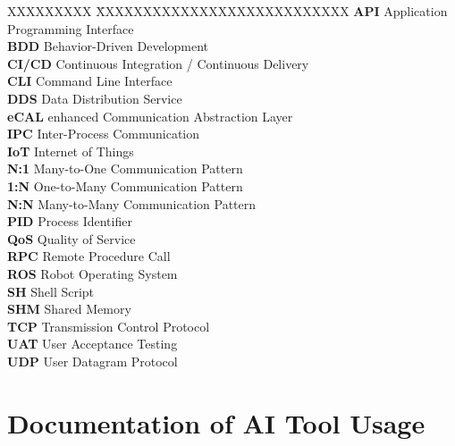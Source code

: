 \documentclass[a4paper,12pt,singlespacing]{article}
\begin{document}
\begin{tabbing}
	XXXXXXXXX \= XXXXXXXXXXXXXXXXXXXXXXXXXXX \kill %
	\textbf{API} \> Application Programming Interface\\[0.3cm]
	\textbf{BDD} \> Behavior-Driven Development\\[0.3cm]
	\textbf{CI/CD} \> Continuous Integration / Continuous Delivery\\[0.3cm]
	\textbf{CLI} \> Command Line Interface\\[0.3cm]
	\textbf{DDS} \> Data Distribution Service\\[0.3cm]
	\textbf{eCAL} \> enhanced Communication Abstraction Layer\\[0.3cm]
	\textbf{IPC} \> Inter-Process Communication\\[0.3cm]
	\textbf{IoT} \> Internet of Things\\[0.3cm]
	\textbf{N:1} \> Many-to-One Communication Pattern\\[0.3cm]
	\textbf{1:N} \> One-to-Many Communication Pattern\\[0.3cm]
	\textbf{N:N} \> Many-to-Many Communication Pattern\\[0.3cm]
	\textbf{PID} \> Process Identifier\\[0.3cm]
	\textbf{QoS} \> Quality of Service\\[0.3cm]
	\textbf{RPC} \> Remote Procedure Call\\[0.3cm]
	\textbf{ROS} \> Robot Operating System\\[0.3cm]
	\textbf{SH} \> Shell Script\\[0.3cm]
	\textbf{SHM} \> Shared Memory\\[0.3cm]
	\textbf{TCP} \> Transmission Control Protocol\\[0.3cm]
	\textbf{UAT} \> User Acceptance Testing\\[0.3cm]
	\textbf{UDP} \> User Datagram Protocol\\[0.3cm]
\end{tabbing}

\pagebreak
{}
\pagestyle{scrheadings}







\printbibliography[heading=bibintoc]

\cleardoublepage
\section*{Documentation of AI Tool Usage}
\end{document}
